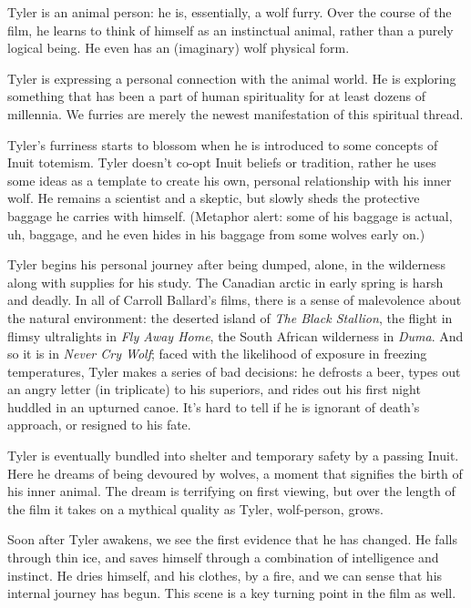 Tyler is an animal person: he is, essentially, a wolf furry. Over the course of the film, he learns to think of himself as an instinctual animal, rather than a purely logical being. He even has an (imaginary) wolf physical form.

Tyler is expressing a personal connection with the animal world. He is exploring something that has been a part of human spirituality for at least dozens of millennia. We furries are merely the newest manifestation of this spiritual thread.

Tyler’s furriness starts to blossom when he is introduced to some concepts of Inuit totemism. Tyler doesn’t co-opt Inuit beliefs or tradition, rather he uses some ideas as a template to create his own, personal relationship with his inner wolf. He remains a scientist and a skeptic, but slowly sheds the protective baggage he carries with himself. (Metaphor alert: some of his baggage is actual, uh, baggage, and he even hides in his baggage from some wolves early on.)

Tyler begins his personal journey after being dumped, alone, in the wilderness along with supplies for his study. The Canadian arctic in early spring is harsh and deadly. In all of Carroll Ballard’s films, there is a sense of malevolence about the natural environment: the deserted island of \textit{The Black Stallion}, the flight in flimsy ultralights in \textit{Fly Away Home}, the South African wilderness in \textit{Duma}. And so it is in \textit{Never Cry Wolf}; faced with the likelihood of exposure in freezing temperatures, Tyler makes a series of bad decisions: he defrosts a beer, types out an angry letter (in triplicate) to his superiors, and rides out his first night huddled in an upturned canoe. It’s hard to tell if he is ignorant of death’s approach, or resigned to his fate.

Tyler is eventually bundled into shelter and temporary safety by a passing Inuit. Here he dreams of being devoured by wolves, a moment that signifies the birth of his inner animal. The dream is terrifying on first viewing, but over the length of the film it takes on a mythical quality as Tyler, wolf-person, grows.

Soon after Tyler awakens, we see the first evidence that he has changed. He falls through thin ice, and saves himself through a combination of intelligence and instinct. He dries himself, and his clothes, by a fire, and we can sense that his internal journey has begun. This scene is a key turning point in the film as well.


